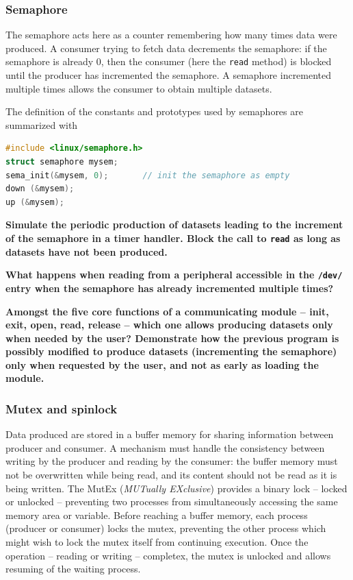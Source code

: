 \documentclass{article}
\begin{document}
{{{\subsubsection{Semaphore}

The semaphore acts here as a counter remembering how many times data were produced. A consumer
trying to fetch data decrements the semaphore: if the semaphore is already 0, then the consumer
(here the {\tt read} method) is blocked until the producer has incremented the semaphore. A
semaphore incremented multiple times allows the consumer to obtain multiple datasets.

The definition of the constants and prototypes used by semaphores are summarized with
\begin{lstlisting}[language=C]
#include <linux/semaphore.h>                            
struct semaphore mysem;                               
sema_init(&mysem, 0);       // init the semaphore as empty 
down (&mysem); 
up (&mysem); 
\end{lstlisting}

{\bf Simulate the periodic production of datasets leading to the increment of the semaphore in
a timer handler. Block the call to {\tt read} as long as datasets have not been produced.}

{\bf What happens when reading from a peripheral accessible in the {\tt /dev/} entry when the
semaphore has already incremented multiple times?}

{\bf Amongst the five core functions of a communicating module -- init, exit, open, read, release -- 
which one allows producing datasets only when needed by the user? Demonstrate how the previous
program is possibly modified to produce datasets (incrementing the semaphore) only when requested
by the user, and not as early as loading the module.}

\subsubsection{Mutex and spinlock}

Data produced are stored in a buffer memory for sharing information between producer and 
consumer. A mechanism must handle the consistency between writing by the producer and reading
by the consumer: the buffer memory must not be overwritten while being read, and its content
should not be read as it is being written. The MutEx ({\em MUTually EXclusive}) provides a binary
lock -- locked or unlocked -- preventing two processes from simultaneously accessing the same
memory area or variable. Before reaching a buffer memory, each process (producer or consumer)
locks the mutex, preventing the other process which might wish to lock the mutex itself from 
continuing execution. Once the operation -- reading or writing -- completex, the mutex is unlocked
and allows resuming of the waiting process.

}}}
\end{document}
